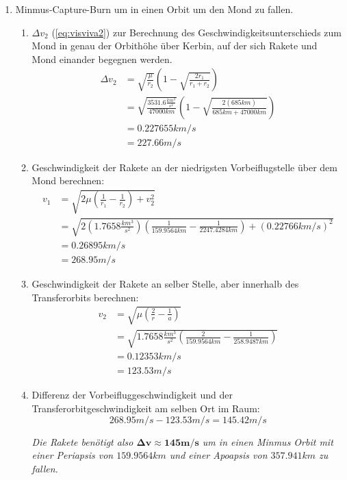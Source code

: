 \documentclass[12pt,paper=A4,numbers=noenddot,bibliography=totoc,listof=totoc,DIV=11,BCOR=1mm]{scrreprt}
\begin{document}
\begin{enumerate}
\item Minmus-Capture-Burn um in einen Orbit um den Mond zu fallen.\\
	\begin{enumerate}
	\item $\Delta v_{2}$ (\ref{eq:visviva2}) zur Berechnung des Geschwindigkeitsunterschieds zum Mond in genau der Orbithöhe über Kerbin, auf der sich Rakete und Mond einander begegnen werden.
	\begin{equation*}
	\begin{split}
	\Delta v_{2} &= \sqrt{\frac{\mu}{r_{2}}} \left( 1-\sqrt{\frac{2r_{1}}{r_{1}+r_{2}}} \right) \\
	             &= \sqrt{\frac{3531.6 \frac{km^{3}}{s^{2}}}{47000km}} \left( 1-\sqrt{\frac{2(685km)}{685km+47000km}} \right) \\
	             &= 0.227655 km/s \\
	             &= 227.66 m/s
	\end{split}
	\end{equation*}
	\item Geschwindigkeit der Rakete an der niedrigsten Vorbeiflugstelle über dem Mond berechnen:
	\begin{equation}
	\begin{split}
	v_{1} &= \sqrt{2\mu \left( \frac{1}{r_{1}} - \frac{1}{r_{2}} \right) + v_{2}^{2} }\\
	      &= \sqrt{2(1.7658 \frac{km^{3}}{s^{2}}) \left( \frac{1}{159.9564km} - \frac{1}{2247.4284km} \right) + (0.22766km/s)^{2} }\\
	      &= 0.26895 km/s \\
	      &= 268.95 m/s
	\end{split}
	\end{equation}
	\item Geschwindigkeit der Rakete an selber Stelle, aber innerhalb des Transferorbits berechnen:
	\begin{equation*}
	\begin{split}
	v_{2} &= \sqrt{\mu \left( \frac{2}{r} - \frac{1}{a} \right) } \\
	      &= \sqrt{1.7658 \frac{km^{3}}{s^{2}} \left( \frac{2}{159.9564km} - \frac{1}{258.9487km} \right) } \\
	      &= 0.12353 km/s \\
	      &= 123.53 m/s
	\end{split}
	\end{equation*}
	\item Differenz der Vorbeifluggeschwindigkeit und der Transferorbitgeschwindigkeit am selben Ort im Raum:
	$$
	268.95 m/s - 123.53 m/s = 145.42 m/s
	$$
	
	\emph{Die Rakete benötigt also $\mathbf{\Delta v \approx 145 m/s}$ um in einen Minmus Orbit mit einer Periapsis von $159.9564km$ und einer Apoapsis von $357.941km$ zu fallen.}
	\end{enumerate}


\end{enumerate}
\bigskip
\end{document}
